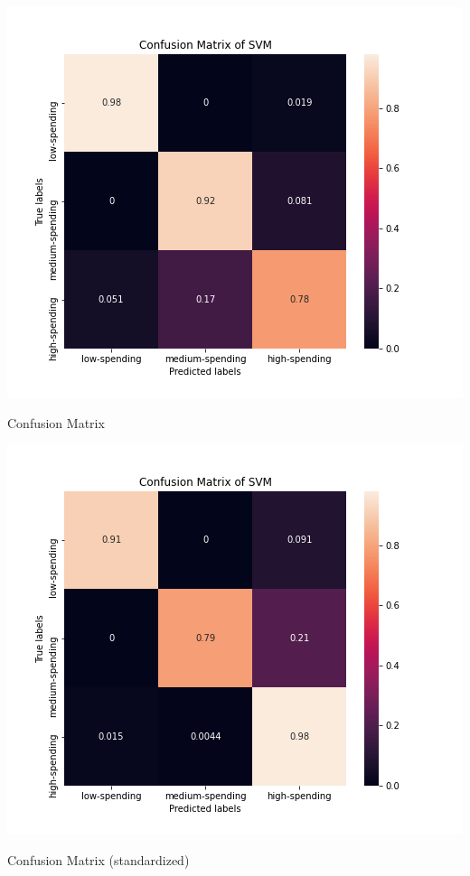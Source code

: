\documentclass[12pt]{article}
\begin{document}
\begin{table}[ht]
\begin{minipage}[b]{0.5\linewidth}
\centering
    \includegraphics[scale=0.5]{images/figure_SVM_without_scaler.png}
\caption{Confusion Matrix}
\label{fig:image}
\end{minipage}
\begin{minipage}[b]{0.5\linewidth}
\centering
    \includegraphics[scale=0.5]{images/figure_SVM_with_scaler.png}
\caption{Confusion Matrix (standardized)}
\label{fig:image}
\end{minipage}
\end{table}
\end{document}
